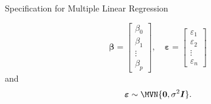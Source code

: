 \documentclass[oneside]{book}\usepackage[]{graphicx}\usepackage[svgnames]{xcolor}
\providecommand{\RandomVector}[1]{\bm{#1}}%
\providecommand{\Vector}[1]{\bm{#1}}%
\providecommand{\Matrix}[1]{\bm{#1}}
\begin{document}
\begin{Regular}{Specification for Multiple Linear Regression}
\begin{itemize}
\[                        \Vector{\beta}=\begin{bmatrix}
                              \beta_0 \\
                              \beta_1 \\
                              \vdots  \\
                              \beta_p
                        \end{bmatrix},\quad
                        \RandomVector{\varepsilon}=\begin{bmatrix}
                              \varepsilon_1 \\
                              \varepsilon_2 \\
                              \vdots        \\
                              \varepsilon_n
                        \end{bmatrix} \]
                  and
                  \[ \RandomVector{\varepsilon}\sim \MVN{\Vector{0},\sigma^2\Matrix{I}}. \]
      \end{itemize}
\end{Regular}
\end{document}
